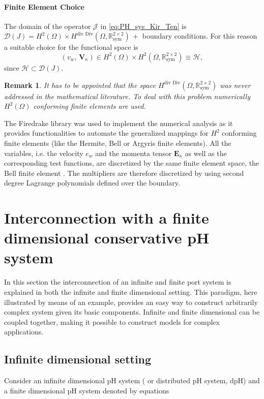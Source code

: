 \documentclass[letterpaper, 10 pt, conference]{ieeeconf}
\newtheorem{remark}{Remark}
\begin{document}
\paragraph{Finite Element Choice}
\label{par:FE}
The domain of the operator $\mathcal{J}$ in \eqref{eq:PH_sys_Kir_Ten} is $\mathcal{D}(J) = H^{2}(\Omega) \times  H^{\text{div Div}}(\Omega, \mathbb{R}^{2 \times 2}_{\text{sym}}) \,+ $ boundary conditions. For this reason a suitable choice for the functional space is
\begin{equation}
(v_w, \,\bm{V}_\kappa) \in H^{2}(\Omega) \times H^{2}(\Omega, \mathbb{R}^{2 \times 2}_{\text{sym}}) \equiv \mathscr{H},
\end{equation}
since $\mathscr{H} \subset \mathcal{D}(J)$. 
\begin{remark}
	It has to be appointed that the space $H^{\text{div Div}}(\Omega, \mathbb{R}^{2 \times 2}_{\text{sym}})$ was never addressed in the mathematical literature. To deal with this problem numerically $H^{2}(\Omega)$ conforming finite elements are used. 
\end{remark}
The Firedrake library \cite{firedrake} was used to implement the numerical analysis as it provides functionalities to automate the generalized mappings for $H^2$ conforming finite elements (like the Hermite, Bell or Argyris finite elements). All the variables, i.e. the velocity $e_w$ and the momenta tensor $\bm{E}_\kappa$ as well as the corresponding test functions, are discretized by the same finite element space, the Bell finite element \cite{Bell}. The multipliers are therefore discretized by using second degree Lagrange polynomials defined over the boundary.


\section{Interconnection with a finite dimensional conservative pH system}
\label{sec:Int}
In this section the interconnection of an infinite and finite port system is explained in both the infinite and finite dimensional setting. This paradigm, here illustrated by means of an example, provides an easy way to construct arbitrarily complex system given its basic components. 
Infinite and finite dimensional can be coupled together, making it possible to construct models for complex applications. 

\subsection{Infinite dimensional setting}
Consider an infinite dimensional pH system ( or distributed pH system, dpH) and a finite dimensional pH system denoted by equations 
\end{document}
